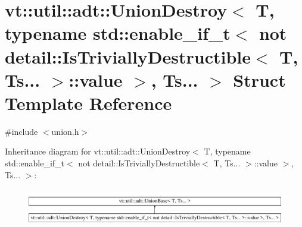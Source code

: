\hypertarget{structvt_1_1util_1_1adt_1_1_union_destroy_3_01_t_00_01typename_01std_1_1enable__if__t_3_01not_0117947c5b8b44b7d9f4a4df27d8795277}{}\section{vt\+:\+:util\+:\+:adt\+:\+:Union\+Destroy$<$ T, typename std\+:\+:enable\+\_\+if\+\_\+t$<$ not detail\+:\+:Is\+Trivially\+Destructible$<$ T, Ts... $>$\+:\+:value $>$, Ts... $>$ Struct Template Reference}
\label{structvt_1_1util_1_1adt_1_1_union_destroy_3_01_t_00_01typename_01std_1_1enable__if__t_3_01not_0117947c5b8b44b7d9f4a4df27d8795277}


{\ttfamily \#include $<$union.\+h$>$}

Inheritance diagram for vt\+:\+:util\+:\+:adt\+:\+:Union\+Destroy$<$ T, typename std\+:\+:enable\+\_\+if\+\_\+t$<$ not detail\+:\+:Is\+Trivially\+Destructible$<$ T, Ts... $>$\+:\+:value $>$, Ts... $>$\+:\begin{figure}[H]
\begin{center}
\leavevmode
\includegraphics[height=1.649485cm]{structvt_1_1util_1_1adt_1_1_union_destroy_3_01_t_00_01typename_01std_1_1enable__if__t_3_01not_0117947c5b8b44b7d9f4a4df27d8795277}
\end{center}
\end{figure}
